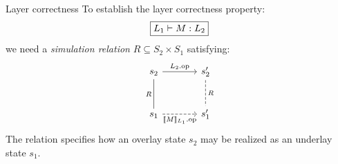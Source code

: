 \documentclass{beamer}
\newcommand{\kw}[1]{\ensuremath{ \mathrm{#1} }}
\newcommand{\bdot}{\boldsymbol{\cdot}}
\begin{document}
\begin{frame}[fragile]{Layer correctness} %
  To establish the layer correctness property:
  \[
    \fbox{$L_1 \vdash M : L_2$}
  \]
  we need a \emph{simulation relation}
  $R \subseteq S_2 \times S_1$ satisfying:
  \[
    \begin{tikzcd}[sep=large]
      s_2 \ar[r, "L_2.\kw{op}"] \ar[d, "R"', dash] &
      s_2' \ar[d, "R", dash, dashed] \\
      s_1 \ar[r, "\llbracket M \rrbracket_{L_1}.\kw{op}"', dashed] &
      s_1'
    \end{tikzcd}
  \]
  The relation specifies how an overlay state $s_2$
  may be realized as an underlay state $s_1$.
\end{frame}

%
%
%
%
\end{document}

